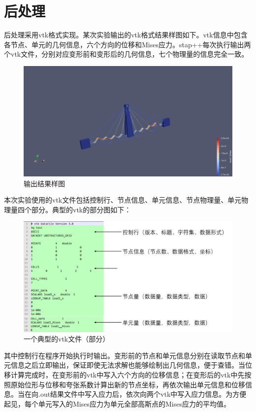 \documentclass{ctexart}
\begin{document}
\section{后处理}
后处理采用vtk格式实现。某次实验输出的vtk格式结果样图如下。vtk信息中包含各节点、单元的几何信息，六个方向的位移和Mises应力。stap++每次执行输出两个vtk文件，分别对应变形前和变形后的几何信息，七个物理量的信息完全一致。
\begin{figure}[H]
\centering  
\includegraphics[width = .8\textwidth]{vtk_1.png} 
\caption{输出结果样图} 
\label{f3.1} 
\end{figure}
本次实验使用的vtk文件包括控制行、节点信息、单元信息、节点物理量、单元物理量四个部分。典型的vtk的部分图如下：
\begin{figure}[H]
\centering  
\includegraphics[width = .8\textwidth]{vtk_2.png} 
\caption{一个典型的vtk文件（部分）} 
\label{f3.2} 
\end{figure}
其中控制行在程序开始执行时输出。变形前的节点和单元信息分别在读取节点和单元信息之后立即输出，保证即使无法求解也能够绘制出几何信息，便于查错。当位移计算完成时，在变形前的vtk中写入六个方向的位移信息；在变形后的vtk中先按照原始位形与位移和夸张系数计算出新的节点坐标，再依次输出单元信息和位移信息。当在向.out结果文件中写入应力后，依次向两个vtk中写入应力信息。为方便起见，每个单元写入的Mises应力为单元全部高斯点的Mises应力的平均值。
\end{document}
